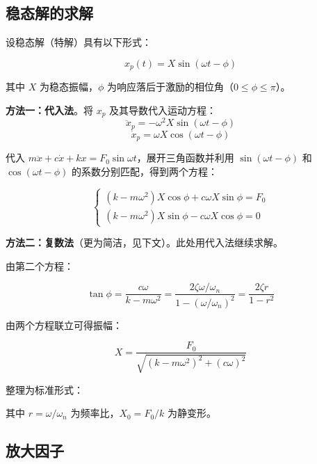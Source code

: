 \subsection{稳态解的求解}

设稳态解（特解）具有以下形式：
\begin{myformula}
    \[
    x_p(t) = X\sin(\omega t - \phi)
    \]
\end{myformula}
其中 $X$ 为稳态振幅，$\phi$ 为响应落后于激励的相位角（$0 \le \phi \le \pi$）。

\textbf{方法一：代入法}。将 $x_p$ 及其导数代入运动方程：
\[
\ddot{x}_p = -\omega^2 X\sin(\omega t-\phi)
\]
\[
\dot{x}_p = \omega X\cos(\omega t-\phi)
\]

代入 $m\ddot{x} + c\dot{x} + kx = F_0\sin\omega t$，展开三角函数并利用 $\sin(\omega t-\phi)$ 和 $\cos(\omega t-\phi)$ 的系数分别匹配，得到两个方程：
\begin{myformula}
    \[
    \begin{cases}
        (k - m\omega^2)X\cos\phi + c\omega X\sin\phi = F_0\\
        (k - m\omega^2)X\sin\phi - c\omega X\cos\phi = 0
    \end{cases}
    \]
\end{myformula}

\textbf{方法二：复数法}（更为简洁，见下文）。此处用代入法继续求解。

由第二个方程：
\begin{myformula}
    \[
    \tan\phi = \frac{c\omega}{k - m\omega^2} = \frac{2\zeta\omega/\omega_n}{1 - (\omega/\omega_n)^2} = \frac{2\zeta r}{1 - r^2}
    \]
\end{myformula}

由两个方程联立可得振幅：
\begin{myformula}
    \[
    X = \frac{F_0}{\sqrt{(k - m\omega^2)^2 + (c\omega)^2}}
    \]
\end{myformula}

整理为标准形式：
\begin{myformula}
    \end{myformula}

\begin{myformula}
    \end{myformula}

其中 $r = \omega/\omega_n$ 为频率比，$X_0 = F_0/k$ 为静变形。

\subsection{放大因子}

